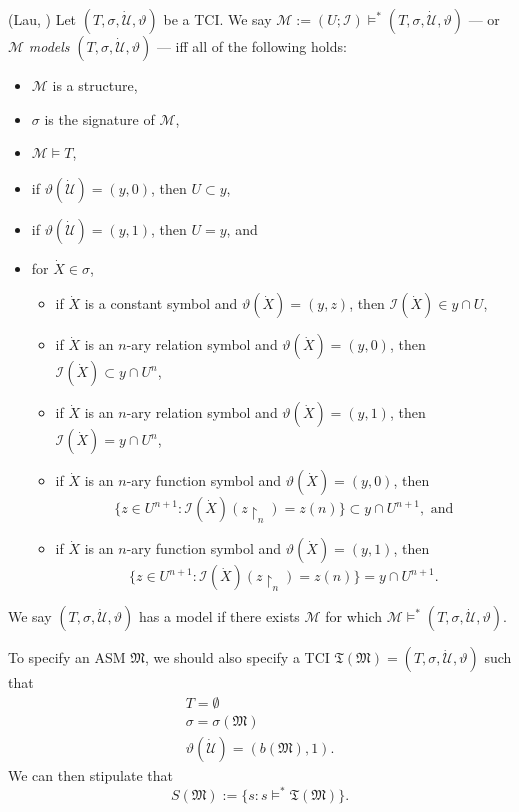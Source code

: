 \documentclass[12pt]{article}
\numberwithin{equation}{section}
\begin{document}
\begin{defi}(Lau, \cite{myself})
Let $(T, \sigma, \dot{\mathcal{U}}, \vartheta)$ be a TCI. We say $\mathcal{M} := (U; \mathcal{I}) \models^* (T, \sigma, \dot{\mathcal{U}}, \vartheta)$ --- or $\mathcal{M}$ \emph{models} $(T, \sigma, \dot{\mathcal{U}}, \vartheta)$ --- iff all of the following holds:
\begin{itemize}
    \item $\mathcal{M}$ is a structure,
    \item $\sigma$ is the signature of $\mathcal{M}$,
    \item $\mathcal{M} \models T$,
    \item if $\vartheta(\dot{\mathcal{U}}) = (y, 0)$, then $U \subset y$,
    \item if $\vartheta(\dot{\mathcal{U}}) = (y, 1)$, then $U = y$, and
    \item for $\dot{X} \in \sigma$,
    \begin{itemize}[label=$\circ$]
        \item if $\dot{X}$ is a constant symbol and $\vartheta(\dot{X}) = (y, z)$, then $\mathcal{I}(\dot{X}) \in y \cap U$,
        \item if $\dot{X}$ is an $n$-ary relation symbol and $\vartheta(\dot{X}) = (y, 0)$, then $\mathcal{I}(\dot{X}) \subset y \cap U^{n}$,
        \item if $\dot{X}$ is an $n$-ary relation symbol and $\vartheta(\dot{X}) = (y, 1)$, then $\mathcal{I}(\dot{X}) = y \cap U^{n}$,
        \item if $\dot{X}$ is an $n$-ary function symbol and $\vartheta(\dot{X}) = (y, 0)$, then $$\{z \in U^{n+1} : \mathcal{I}(\dot{X})(z \! \restriction_n) = z(n)\} \subset y \cap U^{n+1}, \text{ and}$$
        \item if $\dot{X}$ is an $n$-ary function symbol and $\vartheta(\dot{X}) = (y, 1)$, then $$\{z \in U^{n+1} : \mathcal{I}(\dot{X})(z \! \restriction_n) = z(n)\} = y \cap U^{n+1}.$$
    \end{itemize}
\end{itemize}
We say $(T, \sigma, \dot{\mathcal{U}}, \vartheta)$ has a model if there exists $\mathcal{M}$ for which $\mathcal{M} \models^* (T, \sigma, \dot{\mathcal{U}}, \vartheta)$.
\end{defi}

To specify an ASM $\mathfrak{M}$, we should also specify a TCI $\mathfrak{T}(\mathfrak{M}) = (T, \sigma, \dot{\mathcal{U}}, \vartheta)$ such that 
\begin{gather*}
    T = \emptyset \\
    \sigma = \sigma(\mathfrak{M}) \\
    \vartheta(\dot{\mathcal{U}}) = (b(\mathfrak{M}), 1).
\end{gather*}
We can then stipulate that 
\begin{equation*}
    S(\mathfrak{M}) := \{s : s \models^* \mathfrak{T}(\mathfrak{M})\} \text{.}
\end{equation*}
\end{document}
